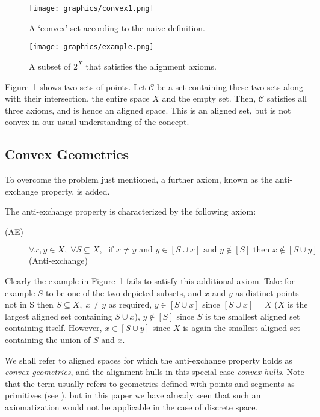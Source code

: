 \documentclass[11pt,a4paper]{llncs}
\newcounter{ax}
\begin{document}
\begin{figure}
\parbox{.4\textwidth}{\texttt{[image: graphics/convex1.png]}
\caption{A `convex' set according to the naive definition.}\label{naive_convex_set}
}\hfill
\parbox{.4\textwidth}{\texttt{[image: graphics/example.png]}
\caption{A subset of $2^X$ that satisfies the alignment axioms.}\label{ex1}
}\end{figure}

Figure~\ref{ex1} shows two sets of points. Let $\mathcal{C}$ be a set containing these two sets along with their intersection, the entire space $X$ and the empty set. Then, $\mathcal{C}$ satisfies all three axioms, and is hence an aligned space. This is an aligned set, but is not convex in our usual understanding of the concept.
\subsection{Convex Geometries}%

To overcome the problem just mentioned, a further axiom, known as the anti-exchange property, is added.

\begin{definition}
\label{ae}
The anti-exchange property is characterized by the following axiom:

\begin{description}
 \item [(AE)] $\forall x,y\in X, \; \forall S\subseteq X,\; \text{ if } x\not= y \text{ and } y\in [S\cup x]\text{ and }y\not\in[S] \text{ then } x\not\in [S\cup y]$\hfill (Anti-exchange)
\end{description}
\end{definition}

Clearly the example in Figure~\ref{ex1} fails to satisfy this additional axiom. Take for example $S$ to be one of the two depicted subsets, and $x$ and $y$ as distinct points not in S then $S\subseteq X,\; x\not= y$ as required, $y\in[S\cup x]$ since $[S\cup x]=X$ ($X$ is the largest aligned set containing $S\cup x$), $y\not\in [S]$ since $S$ is the smallest aligned set containing itself. However, $x\in [S\cup y]$ since $X$ is again the smallest aligned set containing the union of $S$ and $x$.

We shall refer to aligned spaces for which the anti-exchange property holds as \emph{convex geometries}, and the alignment hulls in this special case \emph{convex hulls}. Note that the term usually refers to geometries defined with points and segments as primitives (see \cite{Coppel98}), but in this paper we have already seen that such an axiomatization would not be applicable in the case of discrete space.
\end{document}
